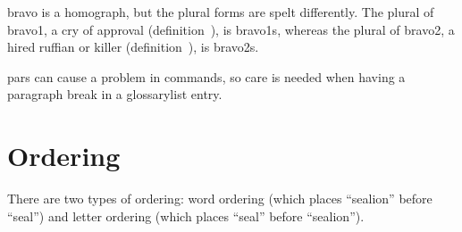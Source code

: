 \documentclass[a4paper]{report}
\begin{document}
\Gls{bravo} is a homograph, but the plural forms are spelt
differently. The plural of \gls{bravo1}, a cry of approval
(definition~), is \glspl{bravo1}, whereas the
plural of \gls{bravo2}, a hired ruffian or killer
(definition~), is \glspl{bravo2}.

\Glspl{par} can cause a problem in commands, so care is needed
when having a paragraph break in a \gls{glossarylist} entry.

\chapter{Ordering}

There are two types of ordering: word ordering (which places
``\gls{sealion}'' before ``\gls{seal}'') and letter ordering
(which places ``\gls{seal}'' before ``\gls{sealion}'').

\printglossaries
\end{document}
